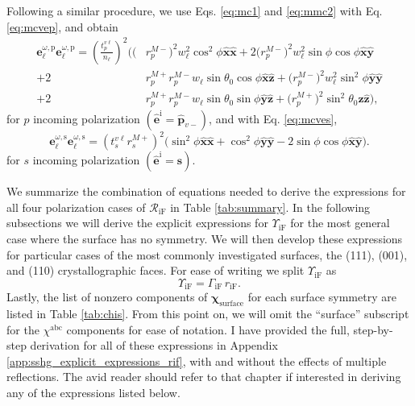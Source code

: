 Following a similar procedure, we use Eqs. \eqref{eq:mc1} and \eqref{eq:mmc2}
with Eq. \eqref{eq:mcvep}, and obtain
\begin{equation}\label{eq:ewewpmr}
\begin{split}
\mathbf{e}^{\omega,\mathrm{p}}_{\ell}\mathbf{e}^{\omega,\mathrm{p}}_{\ell} =
\left(\frac{t^{v\ell}_{p}}{n_{\ell}}\right)^{2}
\bigg(
  \big(&r^{M-}_{p}\big)^{2}w^{2}_{\ell}\cos^{2}\phi
  \hat{\mathbf{x}}\hat{\mathbf{x}}
+ 2\big(r^{M-}_{p}\big)^{2}w^{2}_{\ell}\sin\phi\cos\phi
  \hat{\mathbf{x}}\hat{\mathbf{y}}\\
+ 2&r^{M+}_{p}r^{M-}_{p}w_{\ell}\sin\theta_{0}\cos\phi
  \hat{\mathbf{x}}\hat{\mathbf{z}}
+ \big(r^{M-}_{p}\big)^{2}w^{2}_{\ell}\sin^{2}\phi
  \hat{\mathbf{y}}\hat{\mathbf{y}}\\
+ 2&r^{M+}_{p}r^{M-}_{p}w_{\ell}\sin\theta_{0}\sin\phi
  \hat{\mathbf{y}}\hat{\mathbf{z}}
+ \big(r^{M+}_{p}\big)^{2}\sin^{2}\theta_{0}
   \hat{\mathbf{z}}\hat{\mathbf{z}}
\bigg),
\end{split}
\end{equation}
for $p$ incoming polarization $(\hat{\mathbf{e}}^{\mathrm{i}} =
\hat{\mathbf{p}}_{v-})$, and with Eq. \eqref{eq:mcves},
\begin{equation}\label{eq:ewewsmr}
\mathbf{e}^{\omega,\mathrm{s}}_{\ell}\mathbf{e}^{\omega,\mathrm{s}}_{\ell}
= \left(t^{v\ell}_{s}r^{M+}_{s}\right)^{2}
\big(
  \sin^{2}\phi\hat{\mathbf{x}}\hat{\mathbf{x}}
 + \cos^{2}\phi\hat{\mathbf{y}}\hat{\mathbf{y}}
 - 2\sin\phi\cos\phi\hat{\mathbf{x}}\hat{\mathbf{y}}
\big).
\end{equation}
for $s$ incoming polarization $(\hat{\mathbf{e}}^{\mathrm{i}} =
\hat{\mathbf{s}})$.

We summarize the combination of equations needed to derive the expressions
for all four polarization cases of $\mathcal{R}_{\mathrm{iF}}$ in Table
\ref{tab:summary}. In the following subsections we will derive the explicit
expressions for $\Upsilon_{\mathrm{iF}}$ for the most general case where the
surface has no symmetry. We will then develop these expressions for particular
cases of the most commonly investigated surfaces, the (111), (001), and (110)
crystallographic faces. For ease of writing we split $\Upsilon_{\mathrm{iF}}$ as
\begin{equation}\label{eq:mc25}
\Upsilon_{\mathrm{iF}} = \Gamma_{\mathrm{iF}}\,r_{\mathrm{iF}}.
\end{equation} 
Lastly, the list of nonzero components of $\boldsymbol{\chi}_{\mathrm{surface}}$
for each surface symmetry \cite{sipePRB87, popovbook} are listed in Table
\ref{tab:chis}. From this point on, we will omit the ``surface'' subscript for
the $\chi^{\mathrm{abc}}$ components for ease of notation. I have provided the
full, step-by-step derivation for all of these expressions in Appendix
\ref{app:sshg_explicit_expressions_rif}, with and without the effects of
multiple reflections. The avid reader should refer to that chapter if interested
in deriving any of the expressions listed below.

